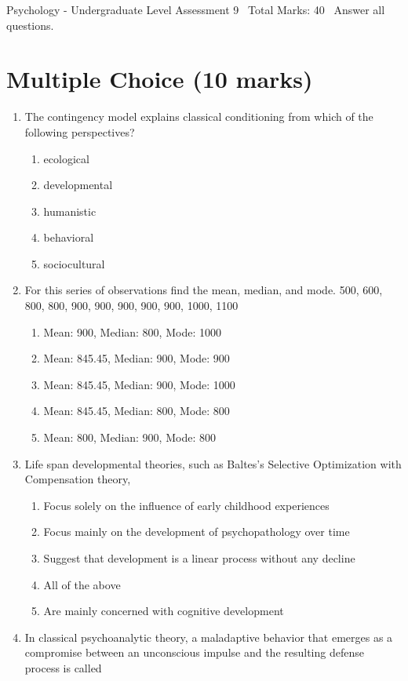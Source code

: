 \documentclass[12pt]{article}
\begin{document}
\begin{center}
Psychology - Undergraduate Level Assessment 9 \
Total Marks: 40 \
Answer all questions.
\end{center}

\section*{Multiple Choice (10 marks)}
\begin{enumerate}[label=\arabic*.]
\item The contingency model explains classical conditioning from which of the following perspectives?
\begin{enumerate}[label=(\alph*)]
    \item ecological
    \item developmental
    \item humanistic
    \item behavioral
    \item sociocultural
\end{enumerate}
\item For this series of observations find the mean, median, and mode. 500, 600, 800, 800, 900, 900, 900, 900, 900, 1000, 1100
\begin{enumerate}[label=(\alph*)]
    \item Mean: 900, Median: 800, Mode: 1000
    \item Mean: 845.45, Median: 900, Mode: 900
    \item Mean: 845.45, Median: 900, Mode: 1000
    \item Mean: 845.45, Median: 800, Mode: 800
    \item Mean: 800, Median: 900, Mode: 800
\end{enumerate}
\item Life span developmental theories, such as Baltes's Selective Optimization with Compensation theory,
\begin{enumerate}[label=(\alph*)]
    \item Focus solely on the influence of early childhood experiences
    \item Focus mainly on the development of psychopathology over time
    \item Suggest that development is a linear process without any decline
    \item All of the above
    \item Are mainly concerned with cognitive development
\end{enumerate}
\item In classical psychoanalytic theory, a maladaptive behavior that emerges as a compromise between an unconscious impulse and the resulting defense process is called

\end{enumerate}
\end{document}
